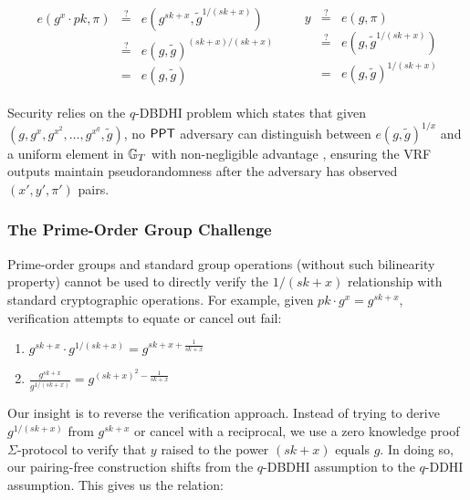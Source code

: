 \begin{align*}
    \begin{array}{rcl}
    e(g^x \cdot pk, \pi) & \stackrel{?}{=} & e(g^{sk+x}, \tilde{g}^{1/(sk+x)}) \\
     & \stackrel{?}{=} & e(g, \tilde{g})^{(sk+x)/(sk+x)} \\
     & = & e(g, \tilde{g})
    \end{array}
    &&
    \begin{array}{rcl}
    y & \stackrel{?}{=} & e(g, \pi) \\
     & \stackrel{?}{=} & e(g,\tilde{g}^{1/(sk+x)}) \\
     & = & e(g, \tilde{g})^{1/(sk+x)}
    \end{array}
\end{align*}

Security relies on the $q$-DBDHI problem which states that given $(g, g^x, g^{x^2}, \ldots, g^{x^q}, \tilde{g})$, no $\mathsf{PPT}$ adversary can distinguish between $e(g,\tilde{g})^{1/x}$ and a uniform element in $\mathbb{G}_T$ with non-negligible advantage , ensuring the VRF outputs maintain pseudorandomness after the adversary has observed $(x',y',\pi')$ pairs.

\subsubsection{The Prime-Order Group Challenge}

Prime-order groups and standard group operations (without such bilinearity property) cannot be used to directly verify the $1/(sk+x)$ relationship with standard cryptographic operations. For example, given $pk  \cdot g^x = g^{sk+x}$, verification attempts to equate or cancel out fail:

\begin{enumerate}
    \item $g^{sk+x} \cdot g^{1/(sk+x)} = g^{sk + x + \frac{1}{sk+x}}$
    \item $\frac{g^{sk+x}}{g^{1/(sk+x)}} = g^{(sk+x)^2-\frac{1}{sk+x}}$
\end{enumerate}

Our insight is to reverse the verification approach. Instead of trying to derive $g^{1/(sk+x)}$ from $g^{sk+x}$ or cancel with a reciprocal, we use a zero knowledge proof $\Sigma$-protocol to verify that $y$ raised to the power $(sk+x)$ equals $g$. In doing so, our pairing-free construction shifts from the $q$-DBDHI assumption to the $q$-DDHI assumption. This gives us the relation:

